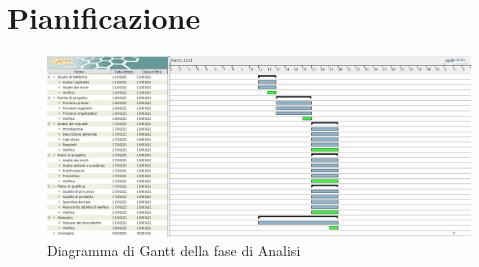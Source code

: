 \section{Pianificazione}
\begin{figure}[htbp]
    \includegraphics[scale=0.2]{../../../Images/Diagrammi/Gantt/diagramma_gantt_analisi_0.2.png}
    \caption{Diagramma di Gantt della fase di Analisi}
\end{figure}